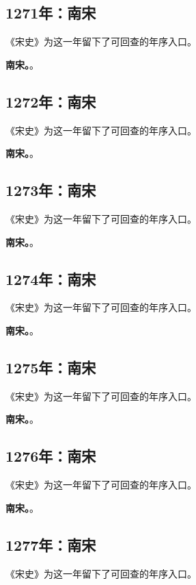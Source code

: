 \subsection{1271年：南宋}
《宋史》为这一年留下了可回查的年序入口。

\noindent\textbf{南宋。}。

\subsection{1272年：南宋}
《宋史》为这一年留下了可回查的年序入口。

\noindent\textbf{南宋。}。

\subsection{1273年：南宋}
《宋史》为这一年留下了可回查的年序入口。

\noindent\textbf{南宋。}。

\subsection{1274年：南宋}
《宋史》为这一年留下了可回查的年序入口。

\noindent\textbf{南宋。}。

\subsection{1275年：南宋}
《宋史》为这一年留下了可回查的年序入口。

\noindent\textbf{南宋。}。

\subsection{1276年：南宋}
《宋史》为这一年留下了可回查的年序入口。

\noindent\textbf{南宋。}。

\subsection{1277年：南宋}
《宋史》为这一年留下了可回查的年序入口。

